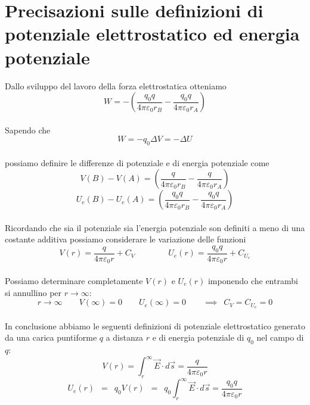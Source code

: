 \documentclass[x11names]{report}
\begin{document}
\section{Precisazioni sulle definizioni di potenziale elettrostatico ed energia potenziale}\label{precisazioni potenziale}
Dallo sviluppo del lavoro della forza elettrostatica otteniamo
\[
W = -\left(\frac{q_0 q}{4\pi \varepsilon_0 r_B} - \frac{q_0 q}{4\pi \varepsilon_0 r_A}\right)
\]\\
Sapendo che
\[
W = -q_0 \Delta V = -\Delta U 
\]\\
possiamo definire le differenze di potenziale e di energia potenziale come
\[
V(B) - V(A) = \left(\frac{ q}{4\pi \varepsilon_0 r_B} - \frac{q}{4\pi \varepsilon_0 r_A}\right)
\]
\[
U_e(B) - U_e(A) = \left(\frac{q_0 q}{4\pi \varepsilon_0 r_B} - \frac{q_0q}{4\pi \varepsilon_0 r_A}\right)
\]\\
Ricordando che sia il potenziale sia l'energia potenziale son definiti a meno di una costante additiva possiamo considerare le variazione delle funzioni
\[
V(r) = \frac{q}{4\pi\varepsilon_0 r} + C_V\qquad \qquad U_e(r) = \frac{q_0q}{4\pi\varepsilon_0 r} + C_{U_e}
\]\\
Possiamo determinare completamente \(V(r)\) e \(U_e(r)\) imponendo che  entrambi si annullino per \(r\to\infty\):
\[
r\to \infty \qquad V(\infty) = 0 \qquad U_e(\infty) = 0 \qquad \implies \;\ C_V = C_{U_e} = 0
\]\\
In conclusione abbiamo le seguenti definizioni di potenziale elettrostatico generato da una carica puntiforme \(q\) a distanza \(r\) e di energia potenziale di \(q_0\) nel campo di \(q\):
\[
V(r) = \int_{r}^{\infty} \vec{E}\cdot d\vec{s} = \frac{q}{4\pi\varepsilon_0 r}
\]
\[
U_e(r) \;\ = \;\ q_0V(r) \;\ = \;\ q_0\int_{r}^{\infty} \vec{E}\cdot d\vec{s} = \frac{q_0q}{4\pi\varepsilon_0 r}
\]
\end{document}
